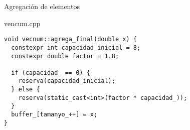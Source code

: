\begin{frame}[t,fragile]{Agregación de elementos}
\begin{block}{vencum.cpp}
\begin{lstlisting}
void vecnum::agrega_final(double x) {
  constexpr int capacidad_inicial = 8;
  constexpr double factor = 1.8;

  if (capacidad_ == 0) {
    reserva(capacidad_inicial);
  } else {
    reserva(static_cast<int>(factor * capacidad_));
  }
  buffer_[tamanyo_++] = x;
}
\end{lstlisting}
\end{block}
\end{frame}
